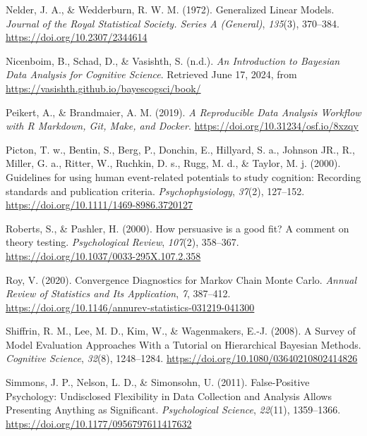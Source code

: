 \documentclass[
  doc,12pt,floatsintext]{apa7}
\newlength{\cslhangindent}
\newenvironment{CSLReferences}[2] %
 {\begin{list}{}{%
  \setlength{\itemindent}{0pt}
  \setlength{\leftmargin}{0pt}
  \setlength{\parsep}{0pt}
  \ifodd #1
   \setlength{\leftmargin}{\cslhangindent}
   \setlength{\itemindent}{-1\cslhangindent}
  \fi
  \setlength{\itemsep}{#2\baselineskip}}}
 {\end{list}}
\begin{document}
\begin{CSLReferences}{1}{0}
Nelder, J. A., \& Wedderburn, R. W. M. (1972). Generalized {Linear Models}. \emph{Journal of the Royal Statistical Society. Series A (General)}, \emph{135}(3), 370--384. \url{https://doi.org/10.2307/2344614}

Nicenboim, B., Schad, D., \& Vasishth, S. (n.d.). \emph{An {Introduction} to {Bayesian Data Analysis} for {Cognitive Science}}. Retrieved June 17, 2024, from \url{https://vasishth.github.io/bayescogsci/book/}

Peikert, A., \& Brandmaier, A. M. (2019). \emph{A {Reproducible Data Analysis Workflow} with {R Markdown}, {Git}, {Make}, and {Docker}}. \url{https://doi.org/10.31234/osf.io/8xzqy}

Picton, T. w., Bentin, S., Berg, P., Donchin, E., Hillyard, S. a., Johnson JR., R., Miller, G. a., Ritter, W., Ruchkin, D. s., Rugg, M. d., \& Taylor, M. j. (2000). Guidelines for using human event-related potentials to study cognition: {Recording} standards and publication criteria. \emph{Psychophysiology}, \emph{37}(2), 127--152. \url{https://doi.org/10.1111/1469-8986.3720127}

Roberts, S., \& Pashler, H. (2000). How persuasive is a good fit? {A} comment on theory testing. \emph{Psychological Review}, \emph{107}(2), 358--367. \url{https://doi.org/10.1037/0033-295X.107.2.358}

Roy, V. (2020). Convergence {Diagnostics} for {Markov Chain Monte Carlo}. \emph{Annual Review of Statistics and Its Application}, \emph{7}, 387--412. \url{https://doi.org/10.1146/annurev-statistics-031219-041300}

Shiffrin, R. M., Lee, M. D., Kim, W., \& Wagenmakers, E.-J. (2008). A {Survey} of {Model Evaluation Approaches With} a {Tutorial} on {Hierarchical Bayesian Methods}. \emph{Cognitive Science}, \emph{32}(8), 1248--1284. \url{https://doi.org/10.1080/03640210802414826}

Simmons, J. P., Nelson, L. D., \& Simonsohn, U. (2011). False-{Positive Psychology}: {Undisclosed Flexibility} in {Data Collection} and {Analysis Allows Presenting Anything} as {Significant}. \emph{Psychological Science}, \emph{22}(11), 1359--1366. \url{https://doi.org/10.1177/0956797611417632}


\end{CSLReferences}
\end{document}
